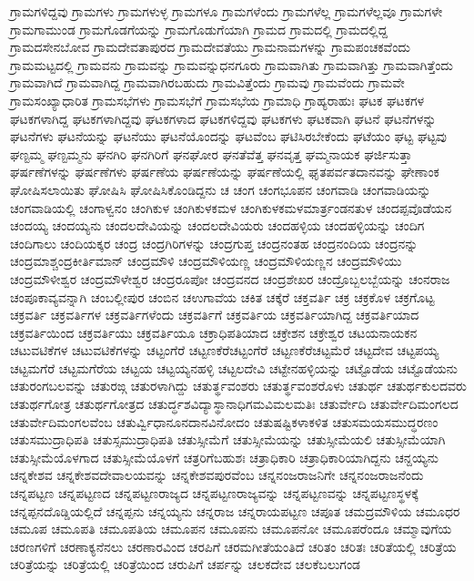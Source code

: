 {ಗ್ರಾಮಗಳಿದ್ದವು
ಗ್ರಾಮಗಳು
ಗ್ರಾಮಗಳುಳ್ಳ
ಗ್ರಾಮಗಳೂ
ಗ್ರಾಮಗಳೆಂದು
ಗ್ರಾಮಗಳೆಲ್ಲ
ಗ್ರಾಮಗಳೆಲ್ಲವೂ
ಗ್ರಾಮಗಳೇ
ಗ್ರಾಮಗಾಮುಂಡ
ಗ್ರಾಮಗೊಡಗೆಯನ್ನು
ಗ್ರಾಮಗೊಡುಗೆಯಾಗಿ
ಗ್ರಾಮದ
ಗ್ರಾಮದಲ್ಲಿ
ಗ್ರಾಮದಲ್ಲಿದ್ದ
ಗ್ರಾಮದಸೇನಬೋವ
ಗ್ರಾಮದೇವತಾಪುರದ
ಗ್ರಾಮದೇವತೆಯು
ಗ್ರಾಮನಾಮಗಳನ್ನು
ಗ್ರಾಮಪಂಚಕವೆಂದು
ಗ್ರಾಮಮಟ್ಟದಲ್ಲಿ
ಗ್ರಾಮವನು
ಗ್ರಾಮವನ್ನು
ಗ್ರಾಮವನ್ನುಧನಗೂರು
ಗ್ರಾಮವಾಗಿತು
ಗ್ರಾಮವಾಗಿತ್ತು
ಗ್ರಾಮವಾಗಿತ್ತೆಂದು
ಗ್ರಾಮವಾಗಿದೆ
ಗ್ರಾಮವಾಗಿದ್ದ
ಗ್ರಾಮವಾಗಿರಬಹುದು
ಗ್ರಾಮವಿತ್ತೆಂದು
ಗ್ರಾಮವು
ಗ್ರಾಮವೆಂದು
ಗ್ರಾಮವೇ
ಗ್ರಾಮಸಂಖ್ಯಾಧಾರಿತ
ಗ್ರಾಮಸಭೆಗಳು
ಗ್ರಾಮಸಭೆಗೆ
ಗ್ರಾಮಸಭೆಯ
ಗ್ರಾಮಾಧಿ
ಗ್ರಾಹ್ಯರಾಹುಃ
ಘಟಕ
ಘಟಕಗಳ
ಘಟಕಗಳಾಗಿದ್ದ
ಘಟಕಗಳಾಗಿದ್ದವು
ಘಟಕಗಳಾದ
ಘಟಕಗಳಿದ್ದವು
ಘಟಕಗಳು
ಘಟಕವಾಗಿ
ಘಟನೆ
ಘಟನೆಗಳನ್ನು
ಘಟನೆಗಳು
ಘಟನೆಯನ್ನು
ಘಟನೆಯು
ಘಟನೆಯೊಂದನ್ನು
ಘಟವೆಂಬ
ಘಟಿಸಿರಬೇಕೆಂದು
ಘಟೆಯಂ
ಘಟ್ಟ
ಘಟ್ಟವು
ಘಣ್ಟಮ್ಮ
ಘಣ್ಟಮ್ಮನು
ಘನಗಿರಿ
ಘನಗಿರಿಗೆ
ಘನಘೋರ
ಘನತೆವೆತ್ತ
ಘನವೃತ್ತ
ಘಮ್ಮನಾಯಕ
ಘರ್ಜಿಸುತ್ತಾ
ಘರ್ಷಣೆಗಳನ್ನು
ಘರ್ಷಣೆಗಳು
ಘರ್ಷಣೆಯ
ಘರ್ಷಣೆಯನ್ನು
ಘರ್ಷಣೆಯಲ್ಲಿ
ಘೃತಪರ್ವತದಾನವನ್ನು
ಘೇಣಾಂಕ
ಘೋಷಿಸಲಾಯಿತು
ಘೋಷಿಸಿ
ಘೋಷಿಸಿಕೊಂಡಿದ್ದನು
ಚ
ಚಂಗ
ಚಂಗಭೂಪನ
ಚಂಗವಾಡಿ
ಚಂಗವಾಡಿಯನ್ನು
ಚಂಗವಾಡಿಯಲ್ಲಿ
ಚಂಗಾಳ್ವನಂ
ಚಂಗಿಕುಳ
ಚಂಗಿಕುಳಕಮಳ
ಚಂಗಿಕುಳಕಮಳಮಾರ್ತ್ರಂಡನತುಳ
ಚಂದಪ್ಪವೊಡೆಯನ
ಚಂದಯ್ಯ
ಚಂದಯ್ಯನು
ಚಂದಲದೇವಿಯನ್ನು
ಚಂದಲದೇವಿಯರು
ಚಂದಹಳ್ಳಿಯ
ಚಂದಹಳ್ಳಿಯನ್ನು
ಚಂದಿಗ
ಚಂದಿಗಾಲು
ಚಂದಿಯಕ್ಕರ
ಚಂದ್ರ
ಚಂದ್ರಗಿರಿಗಳನ್ನು
ಚಂದ್ರಗುಪ್ತ
ಚಂದ್ರನಂತಹ
ಚಂದ್ರನಂದಿಯ
ಚಂದ್ರನನ್ನು
ಚಂದ್ರಮಾಶ್ಚಂದ್ರಕೀರ್ತಿಮಾನ್
ಚಂದ್ರಮೌಳಿ
ಚಂದ್ರಮೌಳಿಯಣ್ಣ
ಚಂದ್ರಮೌಳಿಯಣ್ಣನ
ಚಂದ್ರಮೌಳಿಯು
ಚಂದ್ರಮೌಳೀಶ್ವರ
ಚಂದ್ರಮೌಳೇಶ್ವರ
ಚಂದ್ರರೂಪೋ
ಚಂದ್ರವನದ
ಚಂದ್ರಶೇಖರ
ಚಂದ್ರೊಬ್ಬಲಬ್ಬೆಯನ್ನು
ಚಂನರಾಜ
ಚಂಪೂಕಾವ್ಯವನ್ನಾಗಿ
ಚಂಬಲ್ಲೀಪುರ
ಚಂಬಿನ
ಚಉಗಾವೆಯ
ಚಕಿತ
ಚಕ್ಕೆರೆ
ಚಕ್ತವರ್ತಿ
ಚಕ್ರ
ಚಕ್ರಕೊಳ
ಚಕ್ರಗೊಟ್ಟ
ಚಕ್ರವರ್ತಿ
ಚಕ್ರವರ್ತಿಗಳ
ಚಕ್ರವರ್ತಿಗಳೆಂದು
ಚಕ್ರವರ್ತಿಗೆ
ಚಕ್ರವರ್ತಿಯ
ಚಕ್ರವರ್ತಿಯಾಗಿದ್ದ
ಚಕ್ರವರ್ತಿಯಾದ
ಚಕ್ರವರ್ತಿಯಿಂದ
ಚಕ್ರವರ್ತಿಯು
ಚಕ್ರವರ್ತಿಯೂ
ಚಕ್ರಾಧಿಪತಿಯಾದ
ಚಕ್ರೇಶನ
ಚಕ್ರೇಶ್ವರ
ಚಟಯನಾಯಕನ
ಚಟುವಟಿಕೆಗಳ
ಚಟುವಟಿಕೆಗಳನ್ನು
ಚಟ್ಟಂಗೆರೆ
ಚಟ್ಟಣಕೆರೆಚಟ್ಟಂಗೆರೆ
ಚಟ್ಟಣಕೆರೆಚಟ್ಟಮೆರೆ
ಚಟ್ಟದೇವ
ಚಟ್ಟಪಯ್ಯ
ಚಟ್ಟಮಗೆರೆ
ಚಟ್ಟಮಗೆರೆಯ
ಚಟ್ಟಯ
ಚಟ್ಟಯ್ಯನಹಳ್ಳಿ
ಚಟ್ಟಲದೇವಿ
ಚಟ್ಟೇನಹಳ್ಳಿಯನ್ನು
ಚಟ್ಟೊಡೆಯ
ಚಟ್ಟೊಡೆಯನು
ಚತುರಂಗಬಲವನ್ನು
ಚತುರಙ್ಗ
ಚತುರಳಾಗಿದ್ದು
ಚತುರ್ತ್ಥವಂಶರು
ಚತುರ್ತ್ಥವಂಶರೊಳು
ಚತುರ್ಥ
ಚತುರ್ಥಕುಲದವರು
ಚತುರ್ಥಗೋತ್ರ
ಚತುರ್ಥಗೋತ್ರದ
ಚತುರ್ದ್ಧಶವಿದ್ಯಾಸ್ಥಾನಾಧಿಗಮವಿಮಲಮತಿಃ
ಚತುರ್ವೇದಿ
ಚತುರ್ವೇದಿಮಂಗಲದ
ಚತುರ್ವೇದಿಮಂಗಲವೆಂಬ
ಚತುರ್ವ್ವಿಧಾನೂನದಾನವಿನೋದಂ
ಚತುಷಷ್ಟಿಕಳಾಕಳಿತ
ಚತುಸಮಯಸಮುದ್ಧರಣಂ
ಚತುಸಮುದ್ರಾಧಿಪತಿ
ಚತುಸ್ಸಮುದ್ರಾಧಿಪತಿ
ಚತುಸ್ಸೀಮೆಗೆ
ಚತುಸ್ಸೀಮೆಯನ್ನು
ಚತುಸ್ಸೀಮೆಯಲಿ
ಚತುಸ್ಸೀಮೆಯಾಗಿ
ಚತುಸ್ಸೀಮೆಯೊಳಗಾದ
ಚತುಸ್ಸೀಮೆಯೊಳಗೆ
ಚತ್ರರಿಗೆಬಹುಶಃ
ಚತ್ರಾಧಿಕಾರಿ
ಚತ್ರಾಧಿಕಾರಿಯಾಗಿದ್ದನು
ಚನ್ದಯ್ಯನು
ಚನ್ನಕೇಶವ
ಚನ್ನಕೇಶವದೇವಾಲಯವನ್ನು
ಚನ್ನಕೇಶವಪುರವೆಂಬ
ಚನ್ನನಂಜರಾಜನಿಗೇ
ಚನ್ನನಂಜರಾಜನೆಂದು
ಚನ್ನಪಟ್ಟಣ
ಚನ್ನಪಟ್ಟಣದ
ಚನ್ನಪಟ್ಟಣರಾಜ್ಯದ
ಚನ್ನಪಟ್ಟಣರಾಜ್ಯವನ್ನು
ಚನ್ನಪಟ್ಟಣವನ್ನು
ಚನ್ನಪಟ್ಟಣಸ್ಥಳಕ್ಕೆ
ಚನ್ನಪ್ಪನದೊಡ್ಡಿಯಲ್ಲಿದೆ
ಚನ್ನಪ್ಪನು
ಚನ್ನಯ್ಯನು
ಚನ್ನರಾಜ
ಚನ್ನರಾಯಪಟ್ಟಣ
ಚಪೂತ
ಚಮದ್ರಮೌಳಿಯ
ಚಮೂಧರ
ಚಮೂಪ
ಚಮೂಪತಿ
ಚಮೂಪತಿಯ
ಚಮೂಪನ
ಚಮೂಪನು
ಚಮೂಪನೋ
ಚಮೂಪರೆಂದೂ
ಚಮ್ಮಾವುಗೆಯ
ಚರಣಗಳಿಗೆ
ಚರಣಾಕ್ಯನೆನಲು
ಚರಣಾರವಿಂದ
ಚರಪಿಗೆ
ಚರಮಗೀತೆಯಂತಿದೆ
ಚರಿತಂ
ಚರಿತಃ
ಚರಿತೆಯಲ್ಲಿ
ಚರಿತ್ರೆಯ
ಚರಿತ್ರೆಯನ್ನು
ಚರಿತ್ರೆಯಲ್ಲಿ
ಚರಿತ್ರೆಯಿಂದ
ಚರುಪಿಗೆ
ಚರ್ಪನ್ನು
ಚಲಕದೇವ
ಚಲಕೆಬಲುಗಂಡ
}
